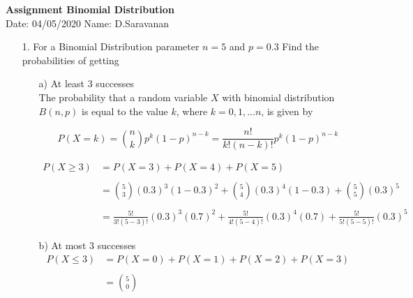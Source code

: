 \documentclass[a4paper,11pt,openright]{report}
\begin{document}
\singlespacing
\pagestyle{plain}

\begin{center}
\textbf{Assignment Binomial Distribution} \\
Date: 04/05/2020 \hspace{2mm} Name: D.Saravanan
\end{center}

\vspace{10px}

\begin{enumerate}

\item[1.] For a Binomial Distribution parameter $n = 5$ and $p = 0.3$ Find the probabilities
of getting

\begin{enumerate}

\item[a)] At least $3$ successes \\
The probability that a random variable $X$  with binomial distribution $B(n,p)$ is equal to
the value $k$, where $k = 0, 1,...n$, is given by

\begin{equation*}
P(X = k) = \binom nk p^{k} (1-p)^{n-k} = \frac{n!}{k! (n-k)!} p^{k} (1-p)^{n-k}
\end{equation*}

\begin{equation*}
\begin{split}
		P(X \geq 3) & = P(X = 3) + P(X = 4) + P(X = 5) \\ \\
		& = \binom 53 (0.3)^{3} (1-0.3)^{2} + \binom 54 (0.3)^{4} (1-0.3) + \binom 55 (0.3)^{5} \\ \\
		& = \frac{5!}{3! (5-3)!} (0.3)^{3} (0.7)^{2} + \frac{5!}{4! (5-4)!} (0.3)^{4} (0.7) + \frac{5!}{5! (5-5)!} (0.3)^{5}
\end{split}
\end{equation*}

\item[b)] At most $3$ successes \\
\begin{equation*}
\begin{split}
		P(X \leq 3) & = P(X = 0) + P(X = 1) + P(X = 2) + P(X = 3) \\ \\
		& = \binom 50
\end{split}
\end{equation*}


\end{enumerate}
\end{enumerate}
\end{document}

